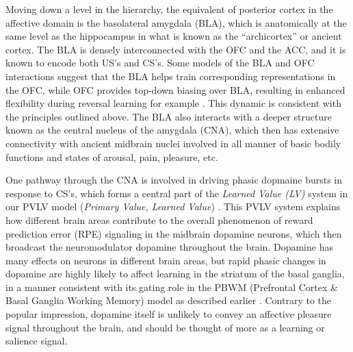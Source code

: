 \documentclass[11pt,twoside]{article}
\begin{document}
Moving down a level in the hierarchy, the equivalent of posterior cortex in
the affective domain is the basolateral amygdala (BLA), which is anatomically
at the same level as the hippocampus in what is known as the ``archicortex''
or ancient cortex.  The BLA is densely interconnected with the OFC and the
ACC, and it is known to encode both US's and CS's.  Some models of the BLA and
OFC interactions suggest that the BLA helps train corresponding
representations in the OFC, while OFC provides top-down biasing over BLA,
resulting in enhanced flexibility during reversal learning for example
\cite{FrankClaus06,PauliHazyOReilly12}.  This dynamic is consistent with the
principles outlined above.  The BLA also interacts with a deeper structure
known as the central nucleus of the amygdala (CNA), which then has extensive
connectivity with ancient midbrain nuclei involved in all manner of basic
bodily functions and states of arousal, pain, pleasure, etc.

One pathway through the CNA is involved in driving phasic dopmaine bursts in
response to CS's, which forms a central part of the {\em Learned Value (LV)}
system in our PVLV model ({\em Primary Value, Learned Value})
\cite{OReillyFrankHazyEtAl07,HazyFrankOReilly10}.  This PVLV system explains
how different brain areas contribute to the overall phenomenon of reward
prediction error (RPE) signaling in the midbrain dopamine neurons, which then
broadcast the neuromodulator dopamine throughout the brain.  Dopamine has many
effects on neurons in different brain areas, but rapid phasic changes in
dopamine are highly likely to affect learning in the striatum of the basal
ganglia, in a manner consistent with its gating role in the PBWM (Prefrontal
Cortex \& Basal Ganglia Working Memory) model as described earlier
\cite{Frank05}.  Contrary to the popular impression, dopamine itself is
unlikely to convey an affective pleasure signal throughout the brain,
and should be thought of more as a learning or salience signal.
\end{document}
